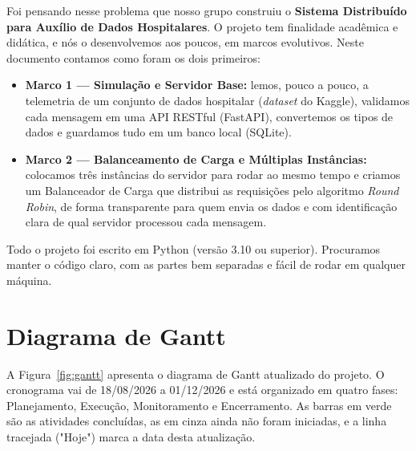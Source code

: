 \documentclass[12pt,a4paper]{article}
\begin{document}
	Foi pensando nesse problema que nosso grupo construiu o \textbf{Sistema Distribuído para Auxílio de Dados Hospitalares}. O projeto tem finalidade acadêmica e didática, e nós o desenvolvemos aos poucos, em marcos evolutivos. Neste documento contamos como foram os dois primeiros:
	
	\begin{itemize}
		\item \textbf{Marco 1 — Simulação e Servidor Base:} lemos, pouco a pouco, a telemetria de um conjunto de dados hospitalar (\textit{dataset} do Kaggle), validamos cada mensagem em uma API RESTful (FastAPI), convertemos os tipos de dados e guardamos tudo em um banco local (SQLite).
		\item \textbf{Marco 2 — Balanceamento de Carga e Múltiplas Instâncias:} colocamos três instâncias do servidor para rodar ao mesmo tempo e criamos um Balanceador de Carga que distribui as requisições pelo algoritmo \textit{Round Robin}, de forma transparente para quem envia os dados e com identificação clara de qual servidor processou cada mensagem.
	\end{itemize}
	
	Todo o projeto foi escrito em Python (versão 3.10 ou superior). Procuramos manter o código claro, com as partes bem separadas e fácil de rodar em qualquer máquina.
	
	\section{Diagrama de Gantt}
	\label{sec:gantt}
	
	A Figura~\ref{fig:gantt} apresenta o diagrama de Gantt atualizado do projeto. O cronograma vai de 18/08/2026 a 01/12/2026 e está organizado em quatro fases: Planejamento, Execução, Monitoramento e Encerramento. As barras em verde são as atividades concluídas, as em cinza ainda não foram iniciadas, e a linha tracejada ("Hoje") marca a data desta atualização.
	
\end{document}
